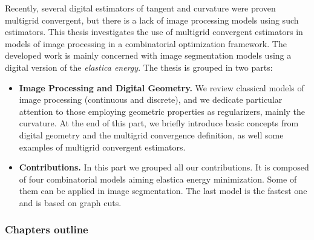 Recently, several digital estimators of tangent and curvature were proven multigrid convergent, but there is a lack of image processing models using such estimators. This thesis investigates the use of multigrid convergent estimators in models of image processing in a combinatorial optimization framework. The developed work is mainly concerned with image segmentation models using a digital version of the \emph{elastica energy}. The thesis is grouped in two parts:

\begin{itemize}
	\item[]{\textbf{Image Processing and Digital Geometry.} We review classical models of image processing (continuous and discrete), and we dedicate particular attention to those employing geometric properties as regularizers, mainly the curvature. At the end of this part, we briefly introduce basic concepts from digital geometry and the multigrid convergence definition, as well some examples of multigrid convergent estimators.}
	\item[]{\textbf{Contributions.} In this part we grouped all our contributions. It is composed of four combinatorial models aiming elastica energy minimization. Some of them can be applied in image segmentation. The last model is the fastest one and is based on graph cuts.}
\end{itemize}

\subsubsection{Chapters outline}

